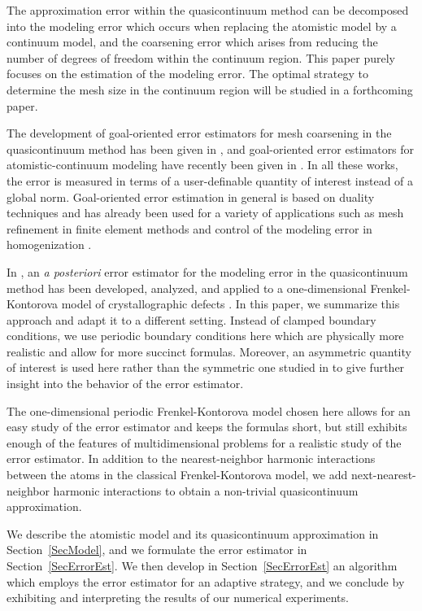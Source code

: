 \documentclass[11pt,reqno,oneside]{amsart}
\numberwithin{equation}{section}
\begin{document}
The approximation error within the quasicontinuum method can be decomposed into the modeling error
which occurs when replacing the atomistic model by a continuum model, and the coarsening error which
arises from reducing the number of degrees of freedom within the continuum region. This paper purely
focuses on the estimation of the modeling error. The optimal strategy to determine the mesh size in
the continuum region will be studied in a forthcoming paper.

The development of goal-oriented error estimators for mesh coarsening in the
quasicontinuum method has been given in
\cite{OdenPrudhommeRomkesBauman:2006, OdenPrudhommeBauman:2006}, and
goal-oriented error estimators for atomistic-continuum modeling have
recently been given in \cite{ArndtLuskin:2007a}.
In all these
works, the error is measured in
terms of a user-definable quantity of interest instead of a global norm.  Goal-oriented error
estimation in general is based on duality techniques and has already been used for a variety of
applications such as mesh refinement in finite element methods \cite{AinsworthOden:2000,
BangerthRannacher:2003} and control of the modeling error in homogenization \cite{OdenVemaganti:2000}.

In \cite{ArndtLuskin:2007a}, an {\em a posteriori} error estimator
for the modeling error in the quasicontinuum method has been
developed, analyzed, and applied to a one-dimensional Frenkel-Kontorova model
of crystallographic defects \cite{Marder:2000}. In this paper, we
summarize this approach and adapt it to a different setting.
Instead of clamped boundary conditions, we use periodic boundary
conditions here which are physically more realistic and allow for
more succinct formulas.  Moreover, an asymmetric quantity of
interest is used here rather than the symmetric one
studied in \cite{ArndtLuskin:2007a} to give further insight into
the behavior of the error estimator.

The one-dimensional periodic Frenkel-Kontorova model chosen here allows for an easy study of the error
estimator and keeps the formulas short, but still exhibits enough of the features of
multidimensional problems for a realistic
study of the error estimator.  In addition to the nearest-neighbor harmonic interactions between the
atoms in the classical Frenkel-Kontorova model, we add next-nearest-neighbor harmonic interactions
to obtain a non-trivial quasicontinuum approximation.

We describe the atomistic model and
its quasicontinuum approximation in Section~\ref{SecModel}, and we formulate the error estimator in
Section~\ref{SecErrorEst}. We then develop
in Section~\ref{SecErrorEst} an algorithm which employs
the error estimator for an adaptive strategy, and we conclude by
exhibiting and interpreting  the results of our numerical
experiments.
\end{document}
